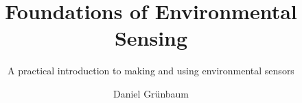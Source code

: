 \documentclass[
	fontsize=10pt, %
	twoside=false, %
	numbers=noenddot, %
]{kaobook}
\begin{document}




\titlehead{Introduction to Environmental Sensors}

\title[Foundations of Environmental Sensing]{Foundations of Environmental Sensing}
\subtitle{A practical introduction to making and using environmental sensors}

\author[DG]{Daniel Gr\"unbaum}


\publishers{Daniel Gr\"unbaum and }


\frontmatter %



\makeatletter
\uppertitleback{\@titlehead} %
\end{document}
